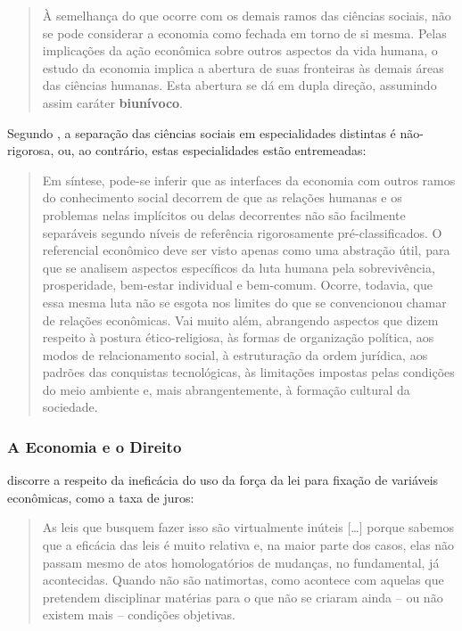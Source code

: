 \documentclass[]{article}
\begin{document}
\begin{quote}
À semelhança do que ocorre com os demais ramos das ciências sociais, não
se pode considerar a economia como fechada em torno de si mesma. Pelas
implicações da ação econômica sobre outros aspectos da vida humana, o
estudo da economia implica a abertura de suas fronteiras às demais áreas
das ciências humanas. Esta abertura se dá em dupla direção, assumindo
assim caráter \textbf{biunívoco}.
\end{quote}

Segundo , a separação das ciências sociais em
especialidades distintas é não-rigorosa, ou, ao contrário, estas
especialidades estão entremeadas:

\begin{quote}
Em síntese, pode-se inferir que as interfaces da economia com outros
ramos do conhecimento social decorrem de que as relações humanas e os
problemas nelas implícitos ou delas decorrentes não são facilmente
separáveis segundo níveis de referência rigorosamente pré-classificados.
O referencial econômico deve ser visto apenas como uma abstração útil,
para que se analisem aspectos específicos da luta humana pela
sobrevivência, prosperidade, bem-estar individual e bem-comum. Ocorre,
todavia, que essa mesma luta não se esgota nos limites do que se
convencionou chamar de relações econômicas. Vai muito além, abrangendo
aspectos que dizem respeito à postura ético-religiosa, às formas de
organização política, aos modos de relacionamento social, à estruturação
da ordem jurídica, aos padrões das conquistas tecnológicas, às
limitações impostas pelas condições do meio ambiente e, mais
abrangentemente, à formação cultural da sociedade.
\end{quote}

\subsubsection{A Economia e o Direito}\label{a-economia-e-o-direito}

 discorre a respeito da ineficácia do
uso da força da lei para fixação de variáveis econômicas, como a taxa de
juros:

\begin{quote}
As leis que busquem fazer isso são virtualmente inúteis {[}\ldots{}{]}
porque sabemos que a eficácia das leis é muito relativa e, na maior
parte dos casos, elas não passam mesmo de atos homologatórios de
mudanças, no fundamental, já acontecidas. Quando não são natimortas,
como acontece com aquelas que pretendem disciplinar matérias para o que
não se criaram ainda -- ou não existem mais -- condições objetivas.
\end{quote}
\end{document}

